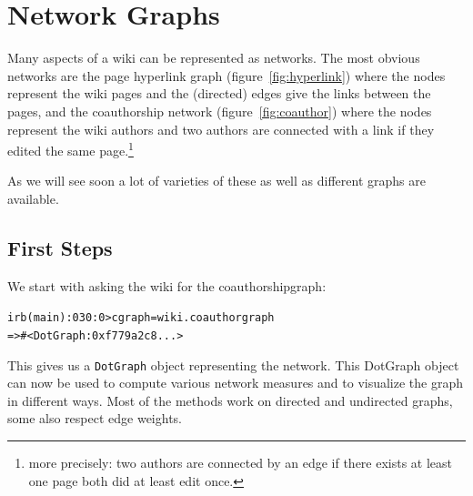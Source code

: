 \documentclass[a4paper]{scrartcl}
\newcounter{tcounter}
\newcommand{\tcount}{\makebox[0pt][r]{\tiny\thetcounter~}}
\newenvironment{typed}{\refstepcounter{tcounter}\bgroup\setlength{\topsep}{0pt}\renewcommand{\FrameCommand}[1]{\fcolorbox{black!30}{bgcolor}{##1}\tcount}\MakeFramed{\FrameRestore}\begin{alltt}\small}{\end{alltt}\endMakeFramed\egroup\par\aftergroup\noindent\aftergroup\ignorespaces}
\newcommand{\cmd}[1]{\texttt{\color{cmd}#1}}
\newcommand{\p}{\textcolor{prompt}}
\renewcommand{\c}{\textcolor{cmd}}
\begin{document}
\section{Network Graphs}
\label{sec:network}

Many aspects of a wiki can be represented as networks. The most
obvious networks are the page hyperlink graph
(figure~\ref{fig:hyperlink}) where the nodes represent the wiki pages
and the (directed) edges give the links between the pages, and the
coauthorship network (figure~\ref{fig:coauthor}) where the nodes
represent the wiki authors and two authors are connected with a link
if they edited the same page.\footnote{more precisely: two authors are
  connected by an edge if there exists at least one page both did at
  least edit once.}

As we will see soon a lot of varieties of these as well as different
graphs are available.

\subsection{First Steps}
\label{sec:dotgraphintro}

We start with asking the wiki for the coauthorshipgraph:
\begin{typed}
\p{irb(main):030:0>} \c{cgraph = wiki.coauthorgraph}
=> #<DotGraph:0xf779a2c8 ...>
\end{typed}
This gives us a \cmd{DotGraph} object representing the network. 
This DotGraph object can now be used to compute various network
measures and to visualize the graph in different ways.
Most of the methods work on directed and undirected graphs, some also
respect edge weights.
\end{document}
